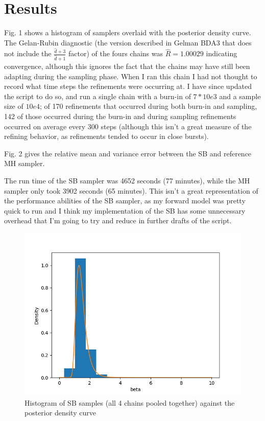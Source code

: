 \documentclass[12pt,a4paper]{article}
\begin{document}
\section{Results}
Fig. 1 shows a histogram of samplers overlaid with the posterior density curve.  The Gelan-Rubin diagnostic (the version described in Gelman BDA3 that does not include the $\frac{\hat{d}+3}{\hat{d}+1}$ factor) of the fours chains was $\hat{R} = 1.00029$ indicating convergence, although this ignores the fact that the chains may have still been adapting during the sampling phase.  When I ran this chain I had not thought to record what time steps the refinements were occurring at.  I have since updated the script to do so, and run a single chain with a burn-in of $7*10e3$ and a sample size of $10e4$; of 170 refinements that occurred during both burn-in and sampling, 142 of those occurred during the burn-in and during sampling refinements occurred on average every 300 steps (although this isn't a great measure of the refining behavior, as refinements tended to occur in close bursts).

Fig. 2 gives the relative mean and variance error between the SB and reference MH sampler.

The run time of the SB sampler was 4652 seconds (77 minutes), while the MH sampler only took 3902 seconds (65 minutes).  This isn't a great representation of the performance abilities of the SB sampler, as my forward model was pretty quick to run and I think my implementation of the SB has some unnecessary overhead that I'm going to try and reduce in further drafts of the script.

\begin{figure}
  \centering
  \includegraphics[scale=.5]{./Figs/test_sampler_density.png}
  \caption{Histogram of SB samples (all 4 chains pooled together) against the posterior density curve}
\end{figure}
\end{document}
